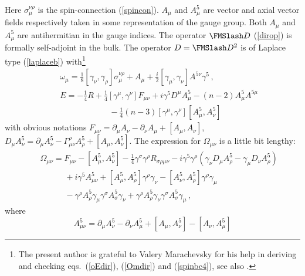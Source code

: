 Here $\sigma_\mu^{\nu\rho}$ is the spin-connection (\ref{spincon}). 
$A_\mu$ and
$A_\mu^5$ are vector and axial vector fields respectively
taken in some representation of the gauge group. Both
$A_\mu$ and $A_\mu^5$ are antihermitian in the gauge indices.
The operator $\Dir$ (\ref{dirop}) is formally self-adjoint
in the bulk.
The operator $D=\Dir^2$ is of Laplace type (\ref{laplaceb}) 
with\footnote{The present author is grateful to Valery Marachevsky
for his help in deriving and checking eqs.\ (\ref{oEdir}),
(\ref{Omdir}) and (\ref{spinbc4}), see also \cite{DeBerredo-Peixoto:2001qm}.}
\begin{eqnarray}
&&\omega_\mu =\frac 18 [\gamma_\nu ,\gamma_\rho ]
\sigma_\mu^{\nu\rho} +A_\mu +\frac i2 [\gamma_\mu ,\gamma_\nu ]
A^{5\nu}\gamma^5 \,, \nonumber \\
&&E=-\frac 14 R +\frac 14 [\gamma^\mu ,\gamma^\nu ]F_{\mu\nu}
+i\gamma^5 D^\mu A_\mu^5 -(n-2)A_\mu^5A^{5\mu} \nonumber \\
&&\qquad\qquad\qquad
-\frac 14 (n-3) [\gamma^\mu ,\gamma^\nu ] [A_\mu^5 ,A_\nu^5 ]
\label{oEdir}
\end{eqnarray}
with obvious notations $F_{\mu\nu}=\partial_\mu A_\nu -
\partial_\nu A_\mu +[A_\mu ,A_\nu ]$, 
$D_\mu A_\nu^5 = \partial_\mu A_\nu^5 -
\Gamma_{\mu\nu}^\rho A_\rho^5 +[A_\mu ,A_\nu^5 ]$.
The expression for $\Omega_{\mu\nu}$ is a little bit
lengthy:
\begin{eqnarray}
&&\Omega_{\mu\nu}=F_{\mu\nu}-[A_\mu^5 ,A_\nu^5 ]-\frac 14
\gamma^\sigma \gamma^\rho R_{\sigma\rho\mu\nu} 
-i\gamma^5\gamma^\rho (\gamma_\nu D_\mu A_\rho^5
-\gamma_\mu D_\nu A_\rho^5 ) \nonumber \\
&&\qquad\quad +i\gamma^5 A_{\mu\nu}^5 
+[A_\mu^5,A_\rho^5] \gamma^\rho \gamma_\nu -
[A_\nu^5,A_\rho^5] \gamma^\rho \gamma_\mu \nonumber \\
&&\qquad\quad 
-\gamma^\rho A_\rho^5 \gamma_\mu \gamma^\sigma A_\sigma^5 \gamma_\nu
+ \gamma^\rho A_\rho^5 \gamma_\nu \gamma^\sigma A_\sigma^5 \gamma_\mu
\,,\label{Omdir}
\end{eqnarray}
where
\begin{equation}
A_{\mu\nu}^5=\partial_\mu A_\nu^5-\partial_\nu A_\mu^5
+[A_\mu ,A_\nu^5 ]-[A_\nu ,A_\mu^5 ] \label{amunu}
\end{equation}

